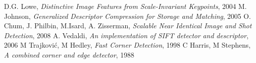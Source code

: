 \documentclass[conference]{IEEEtran}
\begin{document}


%
%
%
\begin{thebibliography}{1}

D.G. Lowe, \emph{Distinctive Image Features from Scale-Invariant Keypoints}, 2004
M. Johnson, \emph{Generalized Descriptor Compression for Storage and Matching}, 2005
O. Chum, J. Philbin, M.Isard, A. Zisserman, \emph{Scalable Near Identical Image and Shot Detection}, 2008
A. Vedaldi, \emph{An implementation of SIFT detector and descriptor}, 2006
M Trajković, M Hedley, \emph{Fast Corner Detection}, 1998
C Harris, M Stephens, \emph{A combined corner and edge detector}, 1988
\end{thebibliography}
\end{document}
